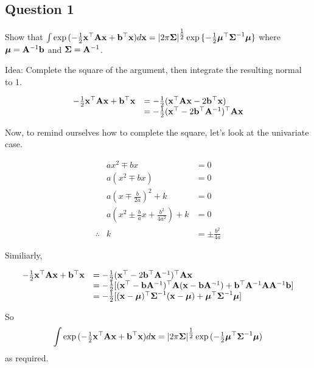\documentclass{amsart}[12pt]
\begin{document}
\subsection{Question 1}

Show that $\int \exp{(- \tfrac{1}{2} {\bf x}^\top {\bf A}{\bf x}+ {\bf b}^\top {\bf x})} d {\bf x} = |2 \pi {\boldsymbol\Sigma}|^{\tfrac{1}{2}} \exp{\{ - \tfrac{1}{2} {\boldsymbol\mu}^\top {\boldsymbol\Sigma}^{-1} {\boldsymbol\mu}\}}$ where ${\boldsymbol \mu} = {\bf A}^{-1} {\bf b}$ and ${\boldsymbol \Sigma} = {\bf A}^{-1}$.

Idea: Complete the square of the argument, then integrate the resulting normal to 1.

\begin{equation*}
\begin{array}{ll}
-\tfrac{1}{2} {\bf x}^\top {\bf A} {\bf x} + {\bf b}^\top {\bf x} &= -\tfrac{1}{2} ({\bf x}^\top {\bf A} {\bf x} - 2 {\bf b}^\top {\bf x}) \\
&= -\tfrac{1}{2} ({\bf x}^\top - 2 {\bf b}^\top {\bf A}^{-1})^\top {\bf A} {\bf x}
\end{array}
\end{equation*}

Now, to remind ourselves how to complete the square, let's look at the univariate case.

\begin{equation*}
\begin{array}{rcl}
& ax^2 \mp bx &= 0 \\
& a(x^2 \mp bx) &= 0 \\
& a(x \mp \frac{b}{2a})^2 + k &= 0 \\
& a(x^2 \pm \frac{b}{a} x + \frac{b^2}{4a^2}) + k &= 0 \\
\therefore & k &= \pm \frac{b^2}{4a}
\end{array}
\end{equation*}

Similiarly,

\begin{equation*}
\begin{array}{ll}
-\tfrac{1}{2} {\bf x}^\top {\bf A} {\bf x} + {\bf b}^\top {\bf x} &= -\tfrac{1}{2}({\bf x}^\top -2{\bf b}^\top {\bf A}^{-1})^\top {\bf A} {\bf x} \\
&= -\tfrac{1}{2} [({\bf x}^\top - {\bf b} {\bf A}^{-1})^\top {\bf A} ({\bf x} - {\bf b} {\bf A}^{-1}) + {\bf b}^\top {\bf A}^{-1} {\bf A} {\bf A}^{-1} {\bf b}] \\
&= -\tfrac{1}{2} [({\bf x} - {\boldsymbol \mu})^\top {\boldsymbol\Sigma}^{-1} ({\bf x} - {\boldsymbol \mu}) + {\boldsymbol \mu}^\top {\boldsymbol\Sigma}^{-1} {\boldsymbol \mu}]
\end{array}
\end{equation*}

So
\begin{equation*}
\int \exp{(- \tfrac{1}{2} {\bf x}^\top {\bf A}{\bf x}+ {\bf b}^\top {\bf x})} d{\bf x} = |2 \pi {\boldsymbol\Sigma}|^{\tfrac{1}{2}} \exp{(- \tfrac{1}{2} {\boldsymbol\mu}^\top {\boldsymbol\Sigma}^{-1} {\boldsymbol\mu})}
\end{equation*}
as required.
\end{document}

